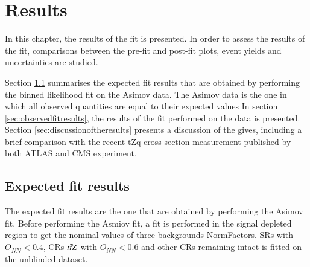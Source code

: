 
\chapter{Results}
\label{chap:results}


In this chapter, the results of the fit is presented. In order to assess the results of the fit, comparisons between the pre-fit and post-fit plots, event yields and uncertainties are studied. 

Section \ref{sec:ecpectedfitresults} summarises the expected fit results that are obtained by performing the binned likelihood fit on the Asimov data. The Asimov data is the one in which all observed quantities are equal to their expected values In section \ref{sec:observedfitresults}, the results of the fit performed on the data is presented. Section \ref{sec:discussionoftheresults} presents a discussion of the gives, including a brief comparison with the recent tZq cross-section measurement published by both ATLAS and CMS experiment.



\section{Expected fit results}
\label{sec:ecpectedfitresults}

The expected fit results are the one that are obtained by performing the  Asimov fit. Before performing the Asmiov fit, a fit is performed in the signal depleted region to get the nominal values of three backgrounds NormFactors. SRs with $O_{NN}<0.4$, CRs $t\Bar{t}Z$ with $O_{NN}<0.6$ and other CRs remaining intact is fitted on the unblinded dataset.

